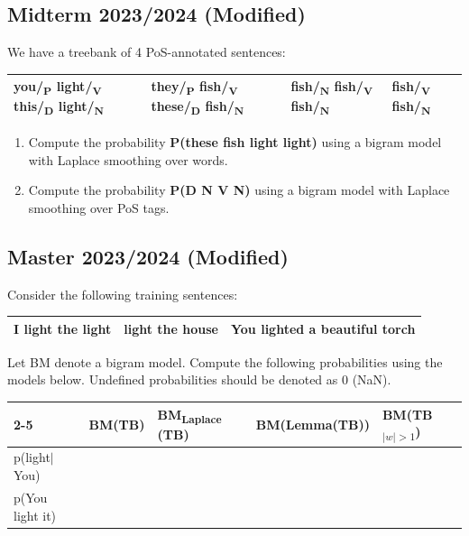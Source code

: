 \documentclass{../extra/aakpract/aakpract}
\begin{document}
	\subsection{Midterm 2023/2024 (Modified)}
	
	We have a treebank of 4 PoS-annotated sentences:
	\begin{center}
		\begin{tabular}{|l|l|l|l|}
			\hline
			you/\textsubscript{P} light/\textsubscript{V} this/\textsubscript{D} light/\textsubscript{N} &
			they/\textsubscript{P} fish/\textsubscript{V} these/\textsubscript{D} fish/\textsubscript{N} &
			fish/\textsubscript{N} fish/\textsubscript{V} fish/\textsubscript{N} &
			fish/\textsubscript{V} fish/\textsubscript{N} \\
			\hline
		\end{tabular}
	\end{center}
	
	\begin{enumerate}
		\item Compute the probability \textbf{P(these fish light light)} using a bigram model with Laplace smoothing over words.
		\item Compute the probability \textbf{P(D N V N)} using a bigram model with Laplace smoothing over PoS tags.
	\end{enumerate}
	
	\subsection{Master 2023/2024 (Modified)}
	
	Consider the following training sentences:
	\begin{center}
		\begin{tabular}{|l|l|l|}
			\hline
			I light the light & 
			light the house &
			You lighted a beautiful torch \\
			\hline
		\end{tabular}
	\end{center}
	
	Let BM denote a bigram model. 
	Compute the following probabilities using the models below. 
	Undefined probabilities should be denoted as 0 (NaN).
	
	\begin{center}
		\begin{tabular}{|l|l|l|l|l|}
			\cline{2-5}
			\multicolumn{1}{c|}{}& BM(TB) & BM\textsubscript{Laplace} (TB) & BM(Lemma(TB)) & BM(TB\textsubscript{$|w|>1$}) \\
			\hline
			p(light$|$You) &&&&\\
			\hline
			p(You light it) &&&& \\
			\hline
		\end{tabular}
	\end{center}
	
\end{document}
